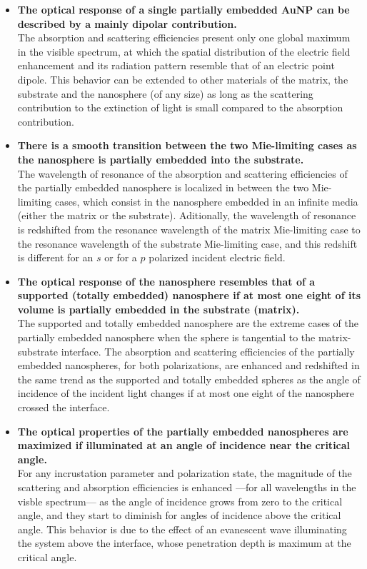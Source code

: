     \begin{itemize}
        \item \textbf{The optical response of a single partially embedded AuNP can be described by a mainly dipolar contribution.}\\
        The absorption and scattering efficiencies present only one global maximum in the visible spectrum, at which the spatial distribution of the electric field enhancement and its radiation pattern resemble that of an electric point dipole. This behavior can be extended to other materials of the matrix, the substrate and the nanosphere (of any size) as long as the scattering contribution to the extinction of light is small compared to the absorption contribution.
        \item \textbf{There is a smooth transition between the two Mie-limiting cases as the nanosphere is partially embedded into the substrate.}\\
        The  wavelength of resonance of the absorption and scattering efficiencies of the partially embedded nanosphere is localized in between the two Mie-limiting cases, which consist in the nanosphere embedded in an infinite media (either the matrix or the substrate). Aditionally, the wavelength of resonance is redshifted from the resonance wavelength of the matrix Mie-limiting case to the resonance wavelength of the substrate Mie-limiting case, and this redshift is different for an $s$ or  for a $p$ polarized incident electric field.
        \item \textbf{The optical response of the nanosphere resembles that of a supported (totally embedded) nanosphere if at most one eight of its volume is partially embedded in the substrate (matrix).}\\
        The supported and totally embedded nanosphere are the extreme cases of the partially embedded nanosphere when the sphere is tangential to the matrix-substrate interface. The absorption and scattering efficiencies of the partially embedded nanospheres, for both polarizations, are enhanced and redshifted in the same trend as the supported and totally embedded spheres as the angle of incidence of the incident light changes if at most one eight of the nanosphere crossed the interface.
        \item \textbf{The optical properties of the partially embedded nanospheres are maximized if illuminated at an angle of incidence near the critical angle.}\\
        For any incrustation parameter and polarization state, the magnitude of the scattering and absorption efficiencies is enhanced ---for all wavelengths in the visble spectrum--- as the angle of incidence grows from zero to the critical angle, and they start to  diminish for angles of incidence above the critical angle. This behavior is due to the effect of an evanescent wave illuminating the system above the interface, whose penetration depth is maximum at the critical angle.

\end{itemize}
